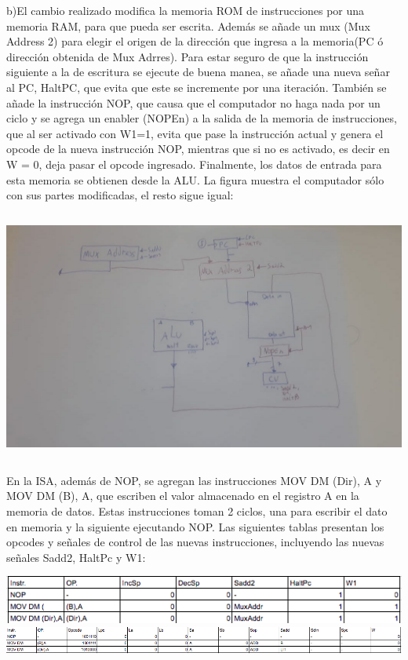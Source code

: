 \documentclass[letter]{article}
\begin{document}
$$ $$
	b)El cambio realizado modifica la memoria ROM de instrucciones por una memoria RAM, para que pueda ser escrita. Además se añade un mux (Mux Address 2) para elegir el origen de la dirección que ingresa a la memoria(PC ó dirección obtenida de Mux Adrres). Para estar seguro de  que la instrucción siguiente a la de escritura se ejecute de buena manea, se añade una nueva señar al PC, HaltPC, que evita que este se incremente por una iteración. También se añade la instrucción NOP, que causa que el computador no haga nada por un ciclo y se agrega un enabler (NOPEn) a la salida de la memoria de instrucciones, que al ser activado con  W1=1, evita que pase la instrucción actual y genera el opcode de la nueva instrucción NOP, mientras que si no es activado, es decir en W = 0, deja pasar el opcode ingresado. Finalmente, los datos de entrada para esta memoria se obtienen desde la ALU. La figura muestra el computador sólo con sus partes modificadas, el resto sigue igual:
	
$$ $$

{\includegraphics[width=15cm]{arqui2.jpeg}}

$$ $$

En la  ISA, además de NOP, se agregan las instrucciones MOV DM (Dir),
A y MOV DM (B), A, que escriben el valor almacenado en el registro A en la memoria de datos.
Estas instrucciones toman 2 ciclos, una para escribir el dato en memoria y la siguiente ejecutando NOP. Las siguientes tablas presentan los opcodes y señales de control de las nuevas instrucciones, incluyendo las nuevas señales Sadd2, HaltPc y W1:


$$ $$
{\includegraphics[width=15cm]{graf2.png}}
$$ $$
{\includegraphics[width=15cm]{graf1.png}}
\end{document}
